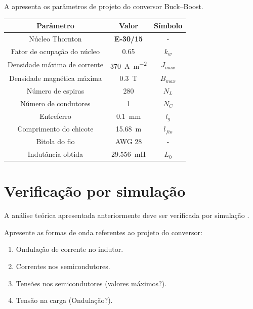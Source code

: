 A  apresenta os parâmetros de projeto do conversor Buck--Boost.
\begin{table}[!ht]
	\centering
	\label{tab:IndutorBuckBoost}
	\begin{tabular}{@{}ccc@{}}
		\toprule
		\textbf{Parâmetro} & \textbf{Valor} & \textbf{Símbolo} \\ \midrule	
			Núcleo  Thornton      & \textbf{E-30/15}    & -  \\				
		Fator de ocupação do núcleo & \SI{0.65}{}     & $k_w$  \\
		Densidade máxima de corrente & \SI{370}{\ampere\per\square\meter}     & $J_{max}$  \\
		Densidade magnética máxima & \SI{0.3}{\tesla}     & $B_{max}$  \\			
		Número de espiras        & \SI{280}{}     & $N_L$  \\	
		Número de condutores        & \SI{1}{}     & $N_C$  \\		
		Entreferro         &  \SI{0.1}{\mm}      & $l_g$  \\
		Comprimento do chicote        &  \SI{15.68}{\m}      & $l_{fio}$  \\
		Bitola do fio        &  AWG 28     & -  \\
		Indutância obtida         & \SI{29.556}{\milli\henry}     & $L_0$  \\ \bottomrule	
	\end{tabular}
\end{table}



\section{Verificação por simulação}

A análise teórica apresentada anteriormente deve ser verificada por simulação \cite{noauthor_psim_nodate}.
									
 Apresente as formas de onda referentes ao projeto do conversor:
 
\begin{enumerate}
	\item Ondulação de corrente no indutor.
	\item Correntes nos semicondutores.
	\item Tensões nos semicondutores (valores máximos?).
	\item Tensão na carga (Ondulação?).
\end{enumerate}


